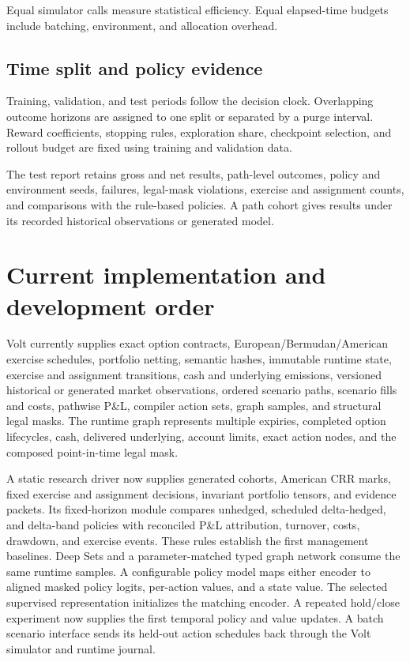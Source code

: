 \documentclass{strategynet-journal}
\newcommand{\VOLT}{\textsf{Volt}}
\begin{document}
\begin{SNcolumns}
Equal simulator calls measure statistical efficiency.  Equal elapsed-time
budgets include batching, environment, and allocation overhead.

\subsection{Time split and policy evidence}

Training, validation, and test periods follow the decision clock.  Overlapping
outcome horizons are assigned to one split or separated by a purge interval.
Reward coefficients, stopping rules, exploration share, checkpoint selection,
and rollout budget are fixed using training and validation data.

The test report retains gross and net results, path-level outcomes, policy and
environment seeds, failures, legal-mask violations, exercise and assignment
counts, and comparisons with the rule-based policies.  A path cohort gives
results under its recorded historical observations or generated model.

\end{SNcolumns}

\section{Current implementation and development order}
\label{sec:implementation}

\VOLT{} currently supplies exact option contracts, European/Bermudan/American
exercise schedules, portfolio netting, semantic hashes, immutable runtime
state, exercise and assignment transitions, cash and underlying emissions,
versioned historical or generated market observations, ordered scenario
paths, scenario fills and costs, pathwise P\&L, compiler action sets, graph
samples, and structural legal masks.  The runtime graph represents multiple
expiries, completed option lifecycles, cash, delivered underlying, account
limits, exact action nodes, and the composed point-in-time legal mask.

A static research driver now supplies generated cohorts, American CRR marks,
fixed exercise and assignment decisions, invariant portfolio tensors, and
evidence packets.  Its fixed-horizon module compares unhedged, scheduled
delta-hedged, and delta-band policies with reconciled P\&L attribution,
turnover, costs, drawdown, and exercise events.  These rules establish the
first management baselines.  Deep Sets and a parameter-matched typed graph
network consume the same runtime samples.  A configurable policy model maps
either encoder to aligned masked policy logits, per-action values, and a
state value.  The selected supervised representation initializes the matching
encoder.  A repeated hold/close experiment now supplies the first temporal
policy and value updates.  A batch scenario interface sends its held-out
action schedules back through the \VOLT{} simulator and runtime journal.
\end{document}
